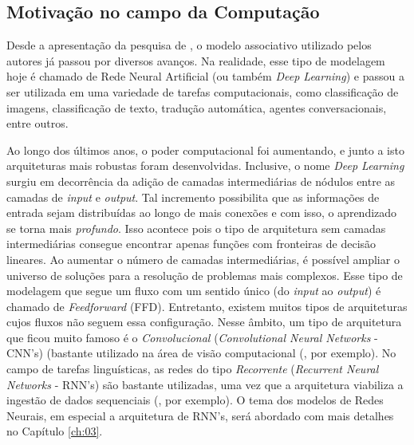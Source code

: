 \subsection{Motivação no campo da Computação}
\label{sec:compmot}

Desde a apresentação da pesquisa de \cite{rumelhart:1986}, o modelo associativo utilizado pelos autores já passou por diversos avanços. Na realidade, esse tipo de modelagem hoje é chamado de Rede Neural Artificial (ou também \textit{Deep Learning}) e passou a ser utilizada em uma variedade de tarefas computacionais, como classificação de imagens, classificação de texto, tradução automática, agentes conversacionais, entre outros. 

Ao longo dos últimos anos, o poder computacional foi aumentando, e junto a isto arquiteturas mais robustas foram desenvolvidas. Inclusive, o nome \textit{Deep Learning} surgiu em decorrência da adição de camadas intermediárias de nódulos entre as camadas de \textit{input} e \textit{output}. Tal incremento possibilita que as informações de entrada sejam distribuídas ao longo de mais conexões e com isso, o aprendizado se torna mais \textit{profundo}. Isso acontece pois o tipo de arquitetura sem camadas intermediárias consegue encontrar apenas funções com fronteiras de decisão lineares. Ao aumentar o número de camadas intermediárias, é possível ampliar o universo de soluções para a resolução de problemas mais complexos. Esse tipo de modelagem que segue um fluxo com um sentido único (do \textit{input} ao \textit{output}) é chamado de \textit{Feedforward} (FFD). Entretanto, existem muitos tipos de arquiteturas cujos fluxos não seguem essa configuração. Nesse âmbito, um tipo de arquitetura que ficou muito famoso é o \textit{Convolucional} (\textit{Convolutional Neural Networks} - CNN's) (bastante utilizado na área de visão computacional (\cite{Krizhevsky:2012}, por exemplo). No campo de tarefas linguísticas, as redes do tipo \textit{Recorrente} (\textit{Recurrent Neural Networks} - RNN's) são bastante utilizadas, uma vez que a arquitetura viabiliza a ingestão de dados sequenciais  (\cite{pengfei:2016}, por exemplo). O tema dos modelos de Redes Neurais, em especial a arquitetura de RNN's, será abordado com mais detalhes no Capítulo \ref{ch:03}.

